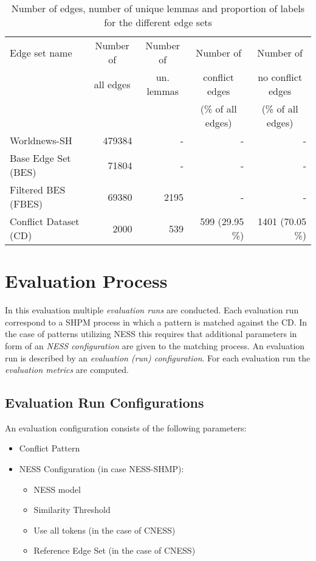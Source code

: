 \documentclass[11pt]{scrreprt}
\begin{document}
\begin{table}
\centering
\begin{tabular}{lrrrr}
\toprule
\multicolumn{1}{l}{Edge set name}	& \multicolumn{1}{c}{Number of} & \multicolumn{1}{c}{Number of}		& \multicolumn{1}{c}{Number of} 		& \multicolumn{1}{c}{Number of} \\
\multicolumn{1}{l}{} 				& \multicolumn{1}{c}{all edges} & \multicolumn{1}{c}{un. lemmas}			& \multicolumn{1}{c}{conflict edges} 	& \multicolumn{1}{c}{no conflict edges} \\
\multicolumn{1}{l}{} 				& \multicolumn{1}{c}{} 			& \multicolumn{1}{c}{}				& \multicolumn{1}{c}{(\% of all edges)} & \multicolumn{1}{c}{(\% of all edges)} \\
\midrule
Worldnews-SH						& 479384		& -			& -					& - \\
Base Edge Set (BES)					& 71804		& -			& -					& - \\
Filtered BES (FBES)					& 69380 		& 2195 		& - 					& - \\
Conflict Dataset (CD)				& 2000 		& 539 		& 599 (29.95 \%) 	& 1401 (70.05 \%) \\
\bottomrule
\end{tabular}
\caption{Number of edges, number of unique lemmas and proportion of labels for the different edge sets}
\label{tab:dataset-descriptions}
\end{table}


\section{Evaluation Process}
In this evaluation multiple \textit{evaluation runs} are conducted. Each evaluation run correspond to a SHPM process in which a pattern is matched against the CD. In the case of patterns utilizing NESS this requires that additional parameters in form of an \textit{NESS configuration} are given to the matching process. An evaluation run is described by an \textit{evaluation (run) configuration}. For each evaluation run the \textit{evaluation metrics} are computed. 

\subsection{Evaluation Run Configurations}
An evaluation configuration consists of the following parameters: 
\begin{itemize}
	\item Conflict Pattern
	\item NESS Configuration (in case NESS-SHMP): 
	\begin{itemize}
		\item NESS model
		\item Similarity Threshold 
		\item Use  all tokens (in the case of CNESS) 
		\item Reference Edge Set (in the case of CNESS) 
	\end{itemize}
\end{itemize}
\end{document}
